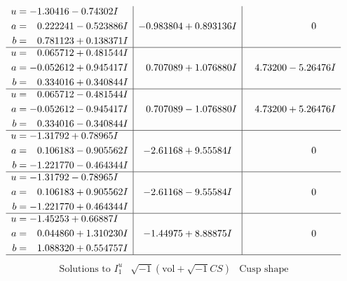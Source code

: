\documentclass[1p]{elsarticle_modified}
\theoremstyle{definition}
\newcommand{\I}{\sqrt{-1}}
\begin{document}
$$\begin{array}{c|c|c}
\begin{aligned}
u &= -1.30416 - 0.74302 I \\
a &= \phantom{-}0.222241 - 0.523886 I \\
b &= \phantom{-}0.781123 + 0.138371 I\end{aligned}
 & -0.983804 + 0.893136 I & \phantom{-0.000000 } 0 \\ \hline\begin{aligned}
u &= \phantom{-}0.065712 + 0.481544 I \\
a &= -0.052612 + 0.945417 I \\
b &= \phantom{-}0.334016 + 0.340844 I\end{aligned}
 & \phantom{-}0.707089 + 1.076880 I & \phantom{-}4.73200 - 5.26476 I \\ \hline\begin{aligned}
u &= \phantom{-}0.065712 - 0.481544 I \\
a &= -0.052612 - 0.945417 I \\
b &= \phantom{-}0.334016 - 0.340844 I\end{aligned}
 & \phantom{-}0.707089 - 1.076880 I & \phantom{-}4.73200 + 5.26476 I \\ \hline\begin{aligned}
u &= -1.31792 + 0.78965 I \\
a &= \phantom{-}0.106183 - 0.905562 I \\
b &= -1.221770 - 0.464344 I\end{aligned}
 & -2.61168 + 9.55584 I & \phantom{-0.000000 } 0 \\ \hline\begin{aligned}
u &= -1.31792 - 0.78965 I \\
a &= \phantom{-}0.106183 + 0.905562 I \\
b &= -1.221770 + 0.464344 I\end{aligned}
 & -2.61168 - 9.55584 I & \phantom{-0.000000 } 0 \\ \hline\begin{aligned}
u &= -1.45253 + 0.66887 I \\
a &= \phantom{-}0.044860 + 1.310230 I \\
b &= \phantom{-}1.088320 + 0.554757 I\end{aligned}
 & -1.44975 + 8.88875 I & \phantom{-0.000000 } 0\\
 \hline 
 \end{array}$$\newpage$$\begin{array}{c|c|c}  
\text{Solutions to }I^u_{1}& \I (\text{vol} + \sqrt{-1}CS) & \text{Cusp shape}\\
 \hline 
\begin{aligned}

\end{aligned}
\end{array}$$
\end{document}
